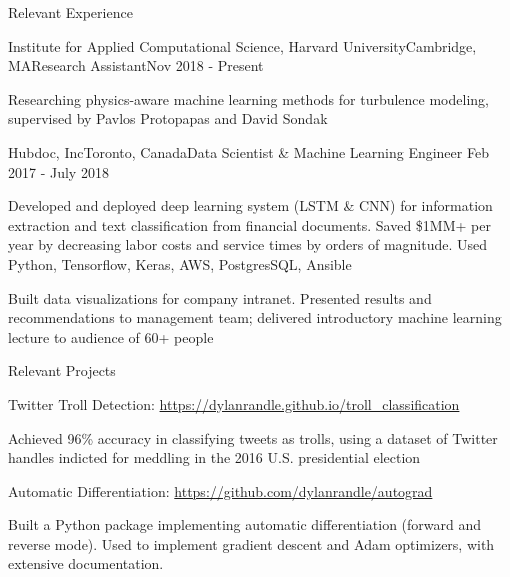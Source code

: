 \documentclass{resume} %
\begin{document}
\begin{rSection}{Relevant Experience}

\begin{rSubsection}{Institute for Applied Computational Science, Harvard University}{Cambridge, MA}{Research Assistant}{Nov 2018 - Present}
\item Researching physics-aware machine learning methods for turbulence modeling, supervised by Pavlos Protopapas and David Sondak
\end{rSubsection}


\begin{rSubsection}{Hubdoc, Inc}{Toronto, Canada}{Data Scientist \& Machine Learning Engineer}{ Feb 2017 - July 2018}
\item Developed and deployed deep learning system (LSTM \& CNN) for information extraction and text classification from financial documents. Saved \$1MM+ per year by decreasing labor costs and service times by orders of magnitude. Used Python, Tensorflow, Keras, AWS, PostgresSQL, Ansible
\item Built data visualizations for company intranet. Presented results and recommendations to management team; delivered introductory machine learning lecture to audience of 60+ people
\end{rSubsection}


\end{rSection}


\begin{rSection}{Relevant Projects}

\begin{rSubsection}{Twitter Troll Detection: \url{https://dylanrandle.github.io/troll_classification}}{}{}{}
\item Achieved 96\% accuracy in classifying tweets as trolls, using a dataset of Twitter handles indicted for meddling in the 2016 U.S. presidential election
\end{rSubsection}


\begin{rSubsection}{Automatic Differentiation: \url{https://github.com/dylanrandle/autograd }}{}{}{}
\item Built a Python package implementing automatic differentiation (forward and reverse mode). Used to implement gradient descent and Adam optimizers, with extensive documentation.
\end{rSubsection}

\end{rSection}
\end{document}
